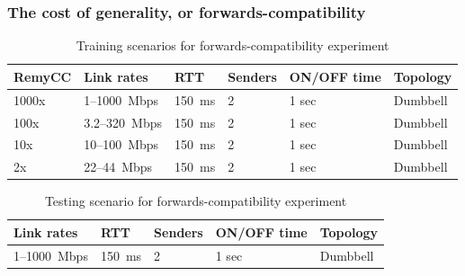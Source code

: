 \begin{frame}
\frametitle{The cost of generality, or forwards-compatibility}
\begin{table}
\begin{center}
\begin{scriptsize}
\begin{tabular}{l|l|l|l|l|l|}
\bf RemyCC & \bf Link rates & \bf RTT & \bf Senders & ON/OFF time & Topology \\
\hline
1000x  & 1--1000~Mbps & 150~ms & 2  & 1 sec & Dumbbell\\
100x   & 3.2--320~Mbps & 150~ms & 2 & 1 sec & Dumbbell\\
10x    & 10--100~Mbps & 150~ms & 2 & 1 sec & Dumbbell \\
2x     & 22--44~Mbps & 150~ms & 2 & 1 sec & Dumbbell \\
\end{tabular}
\end{scriptsize}
\caption{Training scenarios for forwards-compatibility experiment}
\label{table:oprange}
\end{center}
\end{table}

\begin{table}
\begin{center}
\begin{scriptsize}
\begin{tabular}{l|l|l|l|l|}
\bf Link rates & \bf RTT & \bf Senders & ON/OFF time & Topology \\
\hline
1--1000~Mbps & 150~ms & 2  & 1 sec & Dumbbell\\
\end{tabular}
\end{scriptsize}
\caption{Testing scenario for forwards-compatibility experiment}
\label{table:oprange}
\end{center}
\end{table}

\end{frame}

